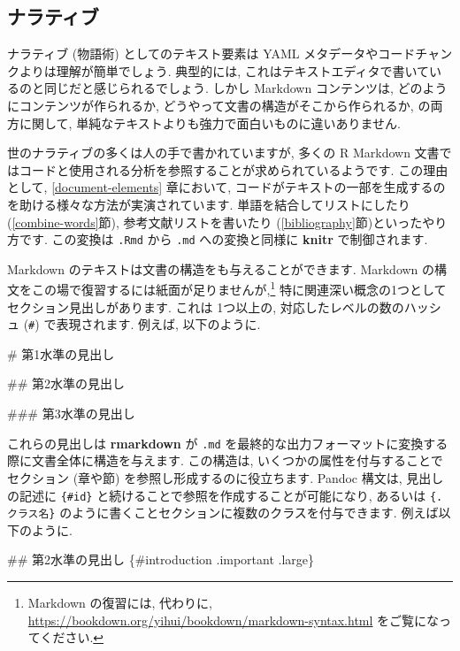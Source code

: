 \documentclass[
  11pt,
]{bxjsreport}
\newenvironment{Shaded}{\begin{snugshade}}{\end{snugshade}}
\newcommand{\FunctionTok}[1]{\textcolor[rgb]{0.00,0.00,0.00}{#1}}
\begin{document}
\hypertarget{narrative}{%
\subsection{ナラティブ}\label{narrative}}

ナラティブ (物語術) としてのテキスト要素は YAML メタデータやコードチャンクよりは理解が簡単でしょう. 典型的には, これはテキストエディタで書いているのと同じだと感じられるでしょう. しかし Markdown コンテンツは, どのようにコンテンツが作られるか, どうやって文書の構造がそこから作られるか, の両方に関して, 単純なテキストよりも強力で面白いものに違いありません.

世のナラティブの多くは人の手で書かれていますが, 多くの R Markdown 文書ではコードと使用される分析を参照することが求められているようです. この理由として, \ref{document-elements} 章において, コードがテキストの一部を生成するのを助ける様々な方法が実演されています. 単語を結合してリストにしたり (\ref{combine-words}節), 参考文献リストを書いたり (\ref{bibliography}節)といったやり方です. この変換は \texttt{.Rmd} から \texttt{.md} への変換と同様に \textbf{knitr} で制御されます.

Markdown のテキストは文書の構造をも与えることができます. Markdown の構文をこの場で復習するには紙面が足りませんが,\footnote{Markdown の復習には, 代わりに, \url{https://bookdown.org/yihui/bookdown/markdown-syntax.html} をご覧になってください.} 特に関連深い概念の1つとしてセクション見出しがあります. これは 1つ以上の, 対応したレベルの数のハッシュ (\texttt{\#}) で表現されます. 例えば, 以下のように.

\begin{Shaded}
\begin{Highlighting}[]
\FunctionTok{\# 第1水準の見出し}

\FunctionTok{\#\# 第2水準の見出し}

\FunctionTok{\#\#\# 第3水準の見出し}
\end{Highlighting}
\end{Shaded}

これらの見出しは \textbf{rmarkdown} が \texttt{.md} を最終的な出力フォーマットに変換する際に文書全体に構造を与えます. この構造は, いくつかの属性を付与することでセクション (章や節) を参照し形成するのに役立ちます. Pandoc 構文は, 見出しの記述に \texttt{\{\#id\}} と続けることで参照を作成することが可能になり, あるいは \texttt{\{.クラス名\}} のように書くことセクションに複数のクラスを付与できます. 例えば以下のように.

\begin{Shaded}
\begin{Highlighting}[]
\FunctionTok{\#\# 第2水準の見出し \{\#introduction .important .large\}}
\end{Highlighting}
\end{Shaded}
\end{document}
